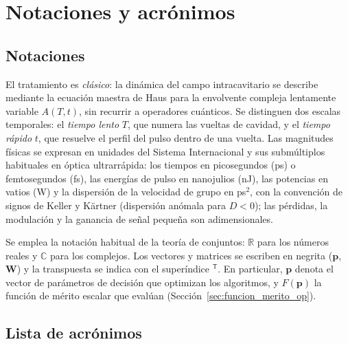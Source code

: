 
\chapter*{Notaciones y acrónimos}

\section*{Notaciones}

El tratamiento es \emph{clásico}: la dinámica del campo intracavitario se describe
mediante la ecuación maestra de Haus para la envolvente compleja lentamente variable
$A(T,t)$, sin recurrir a operadores cuánticos. Se distinguen dos escalas temporales:
el \emph{tiempo lento} $T$, que numera las vueltas de cavidad, y el \emph{tiempo
rápido} $t$, que resuelve el perfil del pulso dentro de una vuelta. Las magnitudes
físicas se expresan en unidades del Sistema Internacional y sus submúltiplos
habituales en óptica ultrarrápida: los tiempos en picosegundos (ps) o femtosegundos
(fs), las energías de pulso en nanojulios (nJ), las potencias en vatios (W) y la
dispersión de la velocidad de grupo en ps$^2$, con la convención de signos de Keller y Kärtner (dispersión anómala para $D<0$); las pérdidas, la modulación y la
ganancia de señal pequeña son adimensionales.

Se emplea la notación habitual de la teoría de conjuntos: $\mathbb{R}$ para los
números reales y $\mathbb{C}$ para los complejos. Los vectores y matrices se escriben
en negrita ($\mathbf{p}$, $\mathbf{W}$) y la transpuesta se indica con el superíndice
$^{\mathsf{T}}$. En particular, $\mathbf{p}$ denota el vector de parámetros de
decisión que optimizan los algoritmos, y $F(\mathbf{p})$ la función de mérito escalar
que evalúan (Sección~\ref{sec:funcion_merito_op}).

\section*{Lista de acrónimos}

